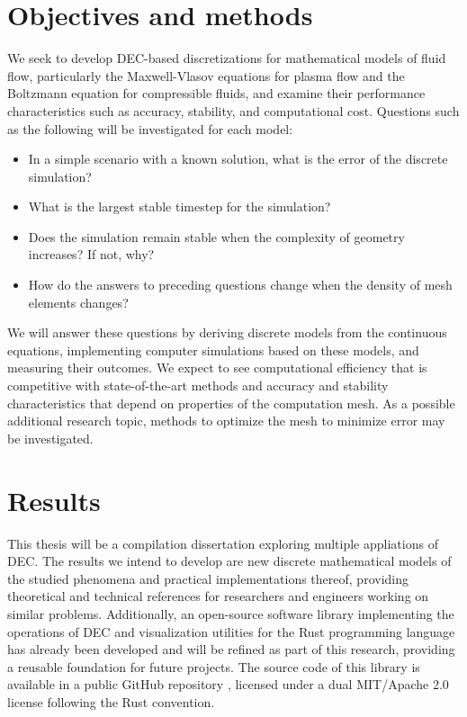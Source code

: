 \documentclass{article}
\begin{document}
\section*{Objectives and methods}

We seek to develop DEC-based discretizations for mathematical models of fluid flow,
particularly the Maxwell-Vlasov equations for plasma flow
and the Boltzmann equation for compressible fluids,
and examine their performance characteristics such as accuracy,
stability, and computational cost.
Questions such as the following will be investigated for each model:
\begin{itemize}
  \item In a simple scenario with a known solution,
  what is the error of the discrete simulation?
  \item What is the largest stable timestep for the simulation?
  \item Does the simulation remain stable when the complexity of geometry increases?
  If not, why?
  \item How do the answers to preceding questions change
  when the density of mesh elements changes?
\end{itemize}

We will answer these questions by deriving discrete models from the continuous equations,
implementing computer simulations based on these models,
and measuring their outcomes.
We expect to see computational efficiency that is competitive with state-of-the-art methods
and accuracy and stability characteristics that depend on properties of the computation mesh.
As a possible additional research topic, methods to optimize the mesh
to minimize error may be investigated.

\section*{Results}

This thesis will be a compilation dissertation exploring multiple appliations of DEC.
The results we intend to develop are new discrete mathematical models of the studied phenomena
and practical implementations thereof,
providing theoretical and technical references
for researchers and engineers working on similar problems.
Additionally, an open-source software library implementing the operations of DEC
and visualization utilities
for the Rust programming language
has already been developed and will be refined as part of this research,
providing a reusable foundation for future projects.
The source code of this library is available
in a public GitHub repository \parencite{myyra_m0lentumdexterior_2024},
licensed under a dual MIT/Apache 2.0 license following the Rust convention.
\end{document}
